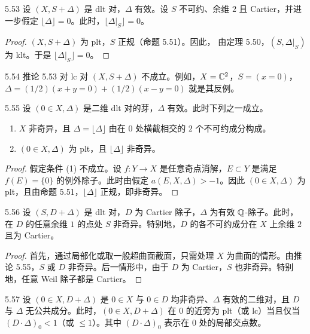 \begin{corollaryp}{5.53}
设 $(X,S+\Delta)$ 是 dlt 对，$\Delta$ 有效。设 $S$ 不可约、余维 $2$ 且 Cartier，并进一步假定 $\lfloor\Delta\rfloor=0$。此时，$\lfloor\Delta|_S\rfloor=0$。
\end{corollaryp}

\begin{proof}
$(X,S+\Delta)$ 为 plt，$S$ 正规（命题 5.51）。因此，
由定理 5.50，$(S,\Delta|_S)$ 为 klt。于是 $\lfloor\Delta|_S\rfloor=0$。
\end{proof}

\begin{remark}{5.54}
推论 5.53 对 lc 对 $(X,S+\Delta)$ 不成立。例如，$X=\mathbb{C}^2$，$S=(x=0)$，$\Delta=(1/2)(x+y=0)+(1/2)(x-y=0)$ 就是其反例。
\end{remark}

\begin{corollaryp}{5.55}
设 $(0\in X,\Delta)$ 是二维 dlt 对的芽，$\Delta$ 有效。此时下列之一成立。
\begin{enumerate}[label=(\arabic*),leftmargin=*]
\item $X$ 非奇异，且 $\Delta=\lfloor\Delta\rfloor$ 由在 $0$ 处横截相交的 $2$ 个不可约成分构成。
\item $(0\in X,\Delta)$ 为 plt，且 $\lfloor\Delta\rfloor$ 非奇异。
\end{enumerate}
\end{corollaryp}

\begin{proof}
假定条件 (1) 不成立。设 $f\colon Y\to X$ 是任意奇点消解，$E\subset Y$ 是满足 $f(E)=\{0\}$ 的例外除子。此时由假定 $a(E,X,\Delta)>-1$。因此 $(0\in X,\Delta)$ 为 plt，且由命题 5.51，$\lfloor\Delta\rfloor$ 正规，即非奇异。
\end{proof}

\begin{corollaryp}{5.56}
设 $(S,D+\Delta)$ 是 dlt 对，$D$ 为 Cartier 除子，$\Delta$ 为有效 $\mathbb{Q}$-除子。此时，在 $D$ 的任意余维 $1$ 的点处 $S$ 非奇异。特别地，$D$ 的各不可约成分在 $X$ 上余维 $2$ 且为 Cartier。
\end{corollaryp}

\begin{proof}
首先，通过局部化或取一般超曲面截面，只需处理 $X$ 为曲面的情形。由推论 5.55，$S$ 或 $D$ 非奇异。后一情形中，由于 $D$ 为 Cartier，$S$ 也非奇异。特别地，任意 Weil 除子都是 Cartier。
\end{proof}

\begin{corollary}{5.57}
设 $(0\in X,D+\Delta)$ 是 $0\in X$ 与 $0\in D$ 均非奇异、$\Delta$ 有效的二维对，且 $D$ 与 $\Delta$ 无公共成分。此时，$(0\in X,D+\Delta)$ 在 $0$ 的近旁为 plt（或 lc）当且仅当 $(D\cdot\Delta)_0<1$（或 $\le1$）。其中 $(D\cdot\Delta)_0$ 表示在 $0$ 处的局部交点数。
\end{corollary}

